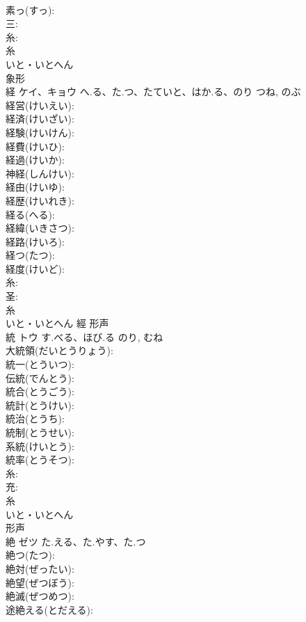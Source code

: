 \documentclass[8pt]{extreport}
\begin{document}
\begin{CJK}{UTF8}{min}
\\	素っ(すっ): 
\\	三: 
\\	糸: 
\\	糸	
\\	いと・いとへん	
\\	象形 
\\	経	ケイ、キョウ	へ.る、た.つ、たていと、はか.る、のり	つね, のぶ	
\\	経営(けいえい): 
\\	経済(けいざい): 
\\	経験(けいけん): 
\\	経費(けいひ): 
\\	経過(けいか): 
\\	神経(しんけい): 
\\	経由(けいゆ): 
\\	経歴(けいれき): 
\\	経る(へる): 
\\	経緯(いきさつ): 
\\	経路(けいろ): 
\\	経つ(たつ): 
\\	経度(けいど): 
\\	糸: 
\\	圣: 
\\	糸	
\\	いと・いとへん	經	形声 
\\	統	トウ	す.べる、ほび.る	のり, むね	
\\	大統領(だいとうりょう): 
\\	統一(とういつ): 
\\	伝統(でんとう): 
\\	統合(とうごう): 
\\	統計(とうけい): 
\\	統治(とうち): 
\\	統制(とうせい): 
\\	系統(けいとう): 
\\	統率(とうそつ): 
\\	糸: 
\\	充: 
\\	糸	
\\	いと・いとへん	
\\	形声 
\\	絶	ゼツ	た.える、た.やす、た.つ		
\\	絶つ(たつ): 
\\	絶対(ぜったい): 
\\	絶望(ぜつぼう): 
\\	絶滅(ぜつめつ): 
\\	途絶える(とだえる): 

\end{CJK}
\end{document}
